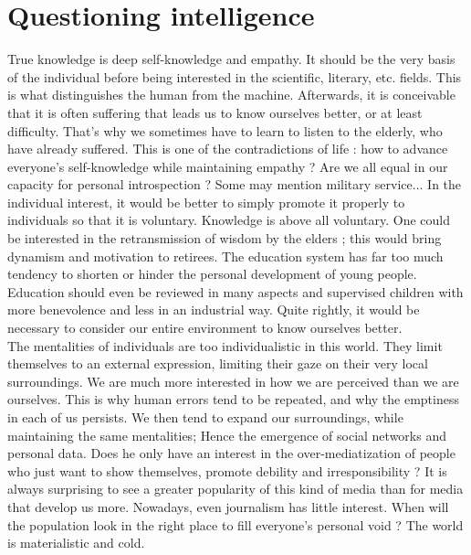 \chapter*{Questioning intelligence}

True knowledge is deep self-knowledge and empathy. It should be the very basis of the individual before being interested in the scientific, literary, etc. fields. This is what distinguishes the human from the machine. Afterwards, it is conceivable that it is often suffering that leads us to know ourselves better, or at least difficulty. That's why we sometimes have to learn to listen to the elderly, who have already suffered. This is one of the contradictions of life : how to advance everyone's self-knowledge while maintaining empathy ? Are we all equal in our capacity for personal introspection ? Some may mention military service... In the individual interest, it would be better to simply promote it properly to individuals so that it is voluntary. Knowledge is above all voluntary. One could be interested in the retransmission of wisdom by the elders ; this would bring dynamism and motivation to retirees. The education system has far too much tendency to shorten or hinder the personal development of young people. Education should even be reviewed in many aspects and supervised children with more benevolence and less in an industrial way. Quite rightly, it would be necessary to consider our entire environment to know ourselves better.\\

The mentalities of individuals are too individualistic in this world. They limit themselves to an external expression, limiting their gaze on their very local surroundings. We are much more interested in how we are perceived than we are ourselves. This is why human errors tend to be repeated, and why the emptiness in each of us persists. We then tend to expand our surroundings, while maintaining the same mentalities; Hence the emergence of social networks and personal data. Does he only have an interest in the over-mediatization of people who just want to show themselves, promote debility and irresponsibility ? It is always surprising to see a greater popularity of this kind of media than for media that develop us more. Nowadays, even journalism has little interest. When will the population look in the right place to fill everyone's personal void ? The world is materialistic and cold.\\

